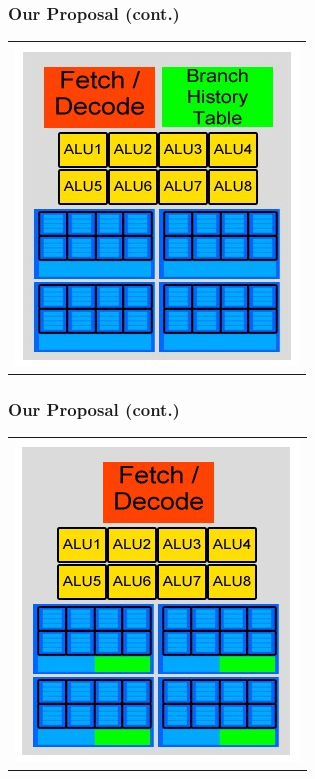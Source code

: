 \documentclass{beamer}
\begin{document}
\begin{frame}
	\frametitle{Our Proposal (cont.)}
	\begin{tabular}{c}
		\includegraphics[width=.5\textwidth]{Our-GPU---per-core-predictor.jpg}
	\end{tabular}
\end{frame}

\begin{frame}
	\frametitle{Our Proposal (cont.)}
	\begin{tabular}{c}
		\includegraphics[width=.5\textwidth]{Our-GPU---per-context-group-predictor.jpg}
	\end{tabular}
\end{frame}
\end{document}
